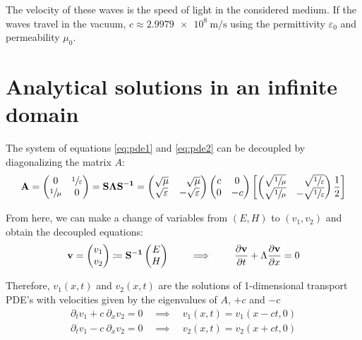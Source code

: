 \documentclass[11 pt]{article}
\begin{document}
The velocity of these waves is the speed of light in the considered medium. If the waves travel in the vacuum, $c \approx \SI{2.9979e8}{\metre\per\second}$ using the permittivity $\varepsilon_0$ and permeability $\mu_0$.

\section{Analytical solutions in an infinite domain}
The system of equations \eqref{eq:pde1} and \eqref{eq:pde2} can be decoupled by diagonalizing the matrix $A$:
\begin{align*}
    \mathbf{A} =
    \begin{pmatrix}
    0& \sfrac{1}{\varepsilon}\\
    \sfrac{1}{\mu} & 0
    \end{pmatrix} = \mathbf{S \Lambda S^{-1}} =
    \begin{pmatrix}
    \sqrt{\mu}& \phantom{+}\sqrt{\mu} \\
    \sqrt{\varepsilon} & -\sqrt{\varepsilon}
    \end{pmatrix}
    \begin{pmatrix}
    c & 0 \\
    0 & -c
    \end{pmatrix}
    \left[\begin{pmatrix}
    \sqrt{\sfrac{1}{\mu}}& \phantom{+}\sqrt{\sfrac{1}{\varepsilon}} \\
    \sqrt{\sfrac{1}{\mu}}& -\sqrt{\sfrac{1}{\varepsilon}}
    \end{pmatrix} \frac{1}{2}\right]
\end{align*}

From here, we can make a change of variables from $(E,H)$ to $(v_1, v_2)$ and obtain the decoupled equations:
\begin{align}
    \mathbf{v} = \begin{pmatrix}v_1 \\ v_2\end{pmatrix} \coloneqq \mathbf{S^{-1}} \begin{pmatrix}E \\ H\end{pmatrix} \qquad \implies \qquad
    \pdv{\mathbf{v}}{t} + \Lambda \pdv{\mathbf{v}}{x} = 0 \label{eq:basis}
\end{align}

Therefore, $v_1(x,t)$ and $v_2(x, t)$ are the solutions of 1-dimensional transport PDE's with velocities given by the eigenvalues of $A$, $+c$ and $-c$
\begin{align*}
    \partial_t v_1 + c \: \partial_x v_2 = 0 \quad \implies \quad v_1(x, t) = v_1(x - ct, 0)\\
    \partial_t v_1 - c \: \partial_x v_2 = 0 \quad \implies \quad v_2(x, t) = v_2(x + ct, 0)
\end{align*}
\end{document}
